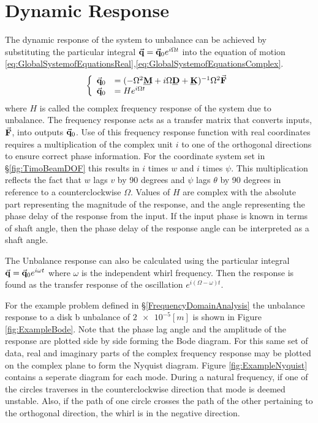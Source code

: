 \section{Dynamic Response}
The dynamic response of the system to unbalance can be achieved by substituting the particular integral $ \vec{\mathbf{q}}=\vec{\mathbf{q}}_0e^{i\Omega t} $ into the equation of motion \eqref{eq:GlobalSystemofEquationsReal},\eqref{eq:GlobalSystemofEquationsComplex}. 
\begin{equation}
\left\{\begin{array}{rl}
\vect{q}_0&=(-\Omega^2\mat{M}+i\Omega\mat{D}+\mat{K})^{-1}\Omega^2\vect{F}\\
\vect{q}_0&=He^{i\Omega t}
\end{array}\right.
\end{equation}
where $ H $ is called the complex frequency response of the system due to unbalance. The frequency response acts as a transfer matrix that converts inputs, $ \vec{\mathbf{F}} $, into outputs $ \vec{\mathbf{q}}_0 $. Use of this frequency response function with real coordinates requires a multiplication of the complex unit $ i $ to one of the orthogonal directions to ensure correct phase information. For the coordinate system set in \S\ref{fig:TimoBeamDOF} this results in $ i $ times $ w $ and $ i $ times $ \psi $. This multiplication reflects the fact that $ w $ lags $ v $ by 90 degrees and $ \psi $ lags $ \theta $ by 90 degrees in reference to a counterclockwise $ \Omega $. Values of $ H $ are complex with the absolute part representing the magnitude of the response, and the angle representing the phase delay of the response from the input. If the input phase is known in terms of shaft angle, then the phase delay of the response angle can be interpreted as a shaft angle.\par 
The Unbalance response can also be calculated using the particular integral $ \vec{\mathbf{q}}=\vec{\mathbf{q}}_0e^{i\omega t} $ where $ \omega $ is the independent whirl frequency. Then the response is found as the transfer response of the oscillation $ e^{i(\Omega-\omega)t} $.\par
For the example problem defined in \S\ref{FrequencyDomainAnalysis} the unbalance response to a disk b unbalance of $ \num{2e-5}[m] $ is shown in Figure \ref{fig:ExampleBode}. Note that the phase lag angle and the amplitude of the response are plotted side by side forming the Bode diagram. For this same set of data, real and imaginary parts of the complex frequency response may be plotted on the complex plane to form the Nyquist diagram. Figure \ref{fig:ExampleNyquist} contains a seperate diagram for each mode. During a natural frequency, if one of the circles traverses in the counterclockwise direction that mode is deemed unstable. Also, if the path of one circle crosses the path of the other pertaining to the orthogonal direction, the whirl is in the negative direction. 
